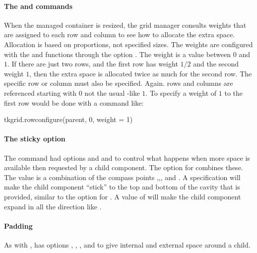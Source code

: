 \paragraph{The  and  commands}
When the managed container is resized, the grid manager consults
weights that are assigned to each row and column to see how to
allocate the extra space. Allocation is based on proportions, not
specified sizes. The weights are configured with the
 and 
functions through the option .
The weight is a value between $0$ and $1$. If there are just two rows, and
the first row has weight $1/2$ and the second weight $1$, then the extra
space is allocated twice as much for the second row. The specific row
or column must also be specified. Again. rows and columns are referenced
starting with $0$ not the usual \R-like $1$. To specify a weight of $1$
to the first row would be done with a command like:

%
\begin{Schunk}
\begin{Sinput}
 tkgrid.rowconfigure(parent, 0, weight = 1)
\end{Sinput}
\end{Schunk}
%
\paragraph{The sticky option}
The  command had options  and
 and  to control what happens when more space
is available then requested by a child component. The
 option for  combines
these. The value is a combination of the compass points
,,, and . A specification
 will make the child component ``stick'' to the top and
bottom of the cavity that is provided, similar to the 
option for . A value of  will make the
child component expand in all the direction like .

\paragraph{Padding}
As with ,  has options
, , ,
and  to give internal and external space around a
child.

